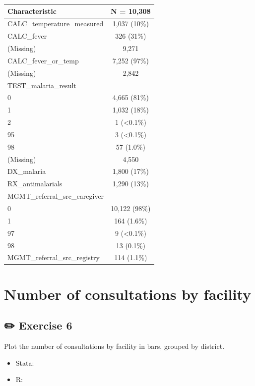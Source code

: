 \documentclass[
  letterpaper,
  DIV=11,
  numbers=noendperiod,
  oneside]{scrreprt}
\providecommand{\tightlist}{%
  \setlength{\itemsep}{0pt}\setlength{\parskip}{0pt}}\usepackage{longtable,booktabs,array}
\begin{document}
\begin{longtable}[]{@{}lc@{}}
\toprule\noalign{}
\textbf{Characteristic} & \textbf{N = 10,308} \\
\midrule\noalign{}
\endhead
\bottomrule\noalign{}
\endlastfoot
CALC\_temperature\_measured & 1,037 (10\%) \\
CALC\_fever & 326 (31\%) \\
(Missing) & 9,271 \\
CALC\_fever\_or\_temp & 7,252 (97\%) \\
(Missing) & 2,842 \\
TEST\_malaria\_result & \\
0 & 4,665 (81\%) \\
1 & 1,032 (18\%) \\
2 & 1 (\textless0.1\%) \\
95 & 3 (\textless0.1\%) \\
98 & 57 (1.0\%) \\
(Missing) & 4,550 \\
DX\_malaria & 1,800 (17\%) \\
RX\_antimalarials & 1,290 (13\%) \\
MGMT\_referral\_src\_caregiver & \\
0 & 10,122 (98\%) \\
1 & 164 (1.6\%) \\
97 & 9 (\textless0.1\%) \\
98 & 13 (0.1\%) \\
MGMT\_referral\_src\_registry & 114 (1.1\%) \\
\end{longtable}

\hypertarget{number-of-consultations-by-facility}{%
\section{Number of consultations by
facility}\label{number-of-consultations-by-facility}}

\subsection{\texorpdfstring{{✏️} Exercise 6}{✏️ Exercise 6}}

Plot the number of consultations by facility in bars, grouped by
district.

\begin{tcolorbox}[enhanced jigsaw, coltitle=black, opacityback=0, title=\textcolor{quarto-callout-tip-color}{\faLightbulb}\hspace{0.5em}{Tip}, toprule=.15mm, bottomtitle=1mm, colbacktitle=quarto-callout-tip-color!10!white, colframe=quarto-callout-tip-color-frame, left=2mm, opacitybacktitle=0.6, bottomrule=.15mm, arc=.35mm, toptitle=1mm, colback=white, titlerule=0mm, breakable, leftrule=.75mm, rightrule=.15mm]

\begin{itemize}
\tightlist
\item
  Stata:
\item
  R:
\end{itemize}

\end{tcolorbox}
\end{document}
